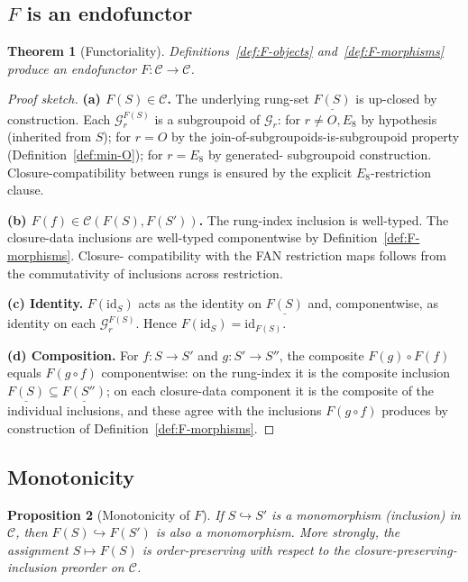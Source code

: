 \documentclass[11pt, a4paper]{amsart}
\newtheorem{theorem}{Theorem}[section]
\newtheorem{proposition}[theorem]{Proposition}
\theoremstyle{definition}
\newcommand{\catC}{\mathcal{C}}
\newcommand{\Gcal}{\mathcal{G}}
\begin{document}
\subsection{$F$ is an endofunctor}
\label{subsec:F-functor}

\begin{theorem}[Functoriality]
\label{thm:F-functor}
Definitions~\ref{def:F-objects} and~\ref{def:F-morphisms} produce
an endofunctor $F \colon \catC \to \catC$.
\end{theorem}

\begin{proof}[Proof sketch]
\textbf{(a) $F(S) \in \catC$.} The underlying rung-set
$\underline{F(S)}$ is up-closed by construction. Each
$\Gcal_r^{F(S)}$ is a subgroupoid of $\Gcal_r$: for $r \ne O,
E_8$ by hypothesis (inherited from $S$); for $r = O$ by the
join-of-subgroupoids-is-subgroupoid property
(Definition~\ref{def:min-O}); for $r = E_8$ by generated-
subgroupoid construction. Closure-compatibility between rungs
is ensured by the explicit $E_8$-restriction clause.

\textbf{(b) $F(f) \in \catC(F(S), F(S'))$.} The rung-index inclusion
is well-typed. The closure-data inclusions are well-typed
componentwise by Definition~\ref{def:F-morphisms}. Closure-
compatibility with the FAN restriction maps follows from the
commutativity of inclusions across restriction.

\textbf{(c) Identity.} $F(\mathrm{id}_S)$ acts as the identity on
$\underline{F(S)}$ and, componentwise, as identity on each
$\Gcal_r^{F(S)}$. Hence $F(\mathrm{id}_S) = \mathrm{id}_{F(S)}$.

\textbf{(d) Composition.} For $f \colon S \to S'$ and $g \colon S'
\to S''$, the composite $F(g) \circ F(f)$ equals $F(g \circ f)$
componentwise: on the rung-index it is the composite inclusion
$\underline{F(S)} \subseteq \underline{F(S'')}$; on each
closure-data component it is the composite of the individual
inclusions, and these agree with the inclusions $F(g \circ f)$
produces by construction of Definition~\ref{def:F-morphisms}.
\end{proof}

\subsection{Monotonicity}
\label{subsec:F-monotone}

\begin{proposition}[Monotonicity of $F$]
\label{prop:F-monotone}
If $S \hookrightarrow S'$ is a monomorphism (inclusion) in $\catC$,
then $F(S) \hookrightarrow F(S')$ is also a monomorphism. More
strongly, the assignment $S \mapsto F(S)$ is order-preserving with
respect to the closure-preserving-inclusion preorder on $\catC$.
\end{proposition}
\end{document}
